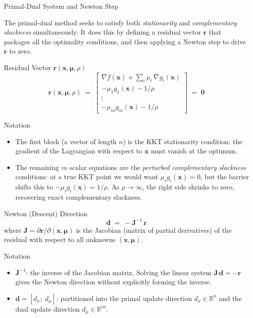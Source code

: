 \documentclass[aspectratio=169,10pt]{beamer}
\newcommand{\bx}{\mathbf{x}}
\newcommand{\bmu}{\boldsymbol{\mu}}
\newcommand{\R}{\mathbb{R}}
\newcommand{\grad}{\nabla}
\begin{document}
\begin{frame}[allowframebreaks]{Primal-Dual System and Newton Step}

  The primal-dual method seeks to satisfy both \emph{stationarity} and
  \emph{complementary slackness} simultaneously.  It does this by defining
  a residual vector $\mathbf{r}$ that packages all the optimality conditions,
  and then applying a Newton step to drive $\mathbf{r}$ to zero.

  \begin{block}{Residual Vector $\mathbf{r}(\bx, \bmu, \rho)$}
    \[
      \mathbf{r}(\bx, \bmu, \rho) \;=\;
      \begin{bmatrix}
        \grad f(\bx) + \displaystyle\sum_i \mu_i\, \grad g_i(\bx) \\[6pt]
        -\mu_1 g_1(\bx) - 1/\rho \\
        \vdots \\
        -\mu_m g_m(\bx) - 1/\rho
      \end{bmatrix}
      \;=\; \mathbf{0}
    \]
  \end{block}

  \begin{block}{Notation}
    \begin{itemize}
      \item The first block (a vector of length $n$) is the KKT stationarity
            condition: the gradient of the Lagrangian with respect to $\bx$
            must vanish at the optimum.
      \item The remaining $m$ scalar equations are the \emph{perturbed
            complementary slackness} conditions: at a true KKT point we would
            want $\mu_i g_i(\bx) = 0$, but the barrier shifts this to
            $-\mu_i g_i(\bx) = 1/\rho$.  As $\rho \to \infty$, the right
            side shrinks to zero, recovering exact complementary slackness.
    \end{itemize}
  \end{block}

  \framebreak

  \begin{block}{Newton (Descent) Direction}
    \[
      \mathbf{d} \;=\; -\mathbf{J}^{-1}\, \mathbf{r}
    \]
    where $\mathbf{J} = \partial \mathbf{r} / \partial(\bx, \bmu)$ is the
    Jacobian (matrix of partial derivatives) of the residual with respect
    to all unknowns $(\bx, \bmu)$.
  \end{block}

  \begin{block}{Notation}
    \begin{itemize}
      \item $\mathbf{J}^{-1}$: the inverse of the Jacobian matrix.
            Solving the linear system $\mathbf{J}\,\mathbf{d} = -\mathbf{r}$
            gives the Newton direction without explicitly forming the inverse.
      \item $\mathbf{d} = [d_x;\; d_\mu]$: partitioned into the primal
            update direction $d_x \in \R^n$ and the dual update direction
            $d_\mu \in \R^m$.
    \end{itemize}
  \end{block}


\end{frame}
\end{document}

